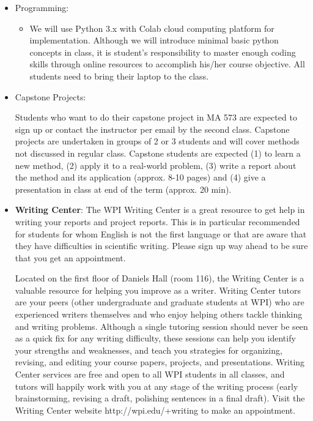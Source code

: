 \documentclass[11pt]{amsart}
\begin{document}
\begin{itemize}
\item Programming: 
\begin{itemize}
 \item We will use Python 3.x with Colab cloud computing platform for implementation. Although we will introduce minimal basic python concepts  in class, it is student's responsibility to master enough coding skills  through online resources to accomplish 
his/her course objective. All students need to bring their laptop to the class.

\end{itemize}





\item {Capstone Projects}: 
\begin{itemize}
 Students who want to do their capstone project in MA 573 are expected to sign up  or contact the instructor per email by  the second class. Capstone projects are undertaken in groups of 2 or 3 students and will cover methods not discussed in regular class. Capstone students are expected (1) to learn a new method, (2) apply it to a real-world problem, (3) write a report about the method and its application (approx. 8-10 pages) and (4) 
 give a presentation in class at end of the term (approx. 20 min).

\end{itemize}



\item \textbf{Writing Center}: The WPI Writing Center is a great resource to get help in writing your reports and project reports. This is in particular recommended for students for whom English is not the first language or that are aware that they have difficulties in scientific writing. Please sign up way ahead to be sure that you get an appointment.

Located on the first floor of Daniels Hall (room 116), the Writing Center is a valuable resource for helping you improve as a writer. Writing Center tutors are your peers (other undergraduate and graduate students at WPI) who are experienced writers themselves and who enjoy helping others tackle thinking and writing problems. Although a single tutoring session should never be seen as a quick fix for any writing difficulty, these sessions can help you identify your strengths and weaknesses, and teach you strategies for organizing, revising, and editing your course papers, projects, and presentations. Writing Center services are free and open to all WPI students in all classes, and tutors will happily work with you at any stage of the writing process (early brainstorming, revising a draft, polishing sentences in a final draft). Visit the Writing Center website 
{http://wpi.edu/+writing} to make an appointment.



\end{itemize}
\end{document}
